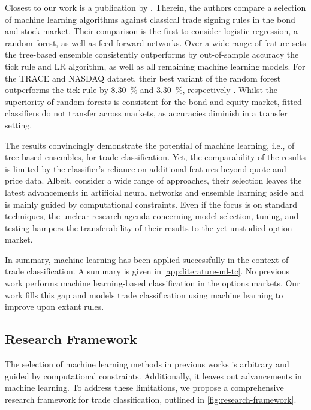 Closest to our work is a publication by \textcite[\checkmark][1--58]{ronenMachineLearningTrade2022}. Therein, the authors compare a selection of machine learning algorithms against classical trade signing rules in the bond and stock market. Their comparison is the first to consider logistic regression, a random forest, as well as \glspl{feed-forward-network}. Over a wide range of feature sets the tree-based ensemble consistently outperforms by out-of-sample accuracy the tick rule and \gls{LR} algorithm, as well as all remaining machine learning models. For the TRACE and \gls{NASDAQ} dataset, their best variant of the random forest outperforms the tick rule by \SI{8.30}{\percent} and \SI{3.30}{\percent}, respectively \autocite[\checkmark][57]{ronenMachineLearningTrade2022}. Whilst the superiority of random forests is consistent for the bond and equity market, fitted classifiers do not transfer across markets, as accuracies diminish in a transfer setting.

The results convincingly demonstrate the potential of machine learning, i.e., of tree-based ensembles, for trade classification. Yet, the comparability of the results is limited by the classifier's reliance on additional features beyond quote and price data. Albeit, \textcite[\checkmark][13--14]{ronenMachineLearningTrade2022} consider a wide range of approaches, their selection leaves the latest advancements in artificial neural networks and ensemble learning aside and is mainly guided by computational constraints. Even if the focus is on standard techniques, the unclear research agenda concerning model selection, tuning, and testing hampers the transferability of their results to the yet unstudied option market.

In summary, machine learning has been applied successfully in the context of trade classification. A summary is given in \cref{app:literature-ml-tc}. No previous work performs machine learning-based classification in the options markets. Our work fills this gap and models trade classification using machine learning to improve upon extant rules.

\subsection{Research Framework}\label{sec:research-framework}

The selection of machine learning methods in previous works is arbitrary and guided by computational constraints. Additionally, it leaves out advancements in machine learning. To address these limitations, we propose a comprehensive research framework for trade classification, outlined in \cref{fig:research-framework}. 

